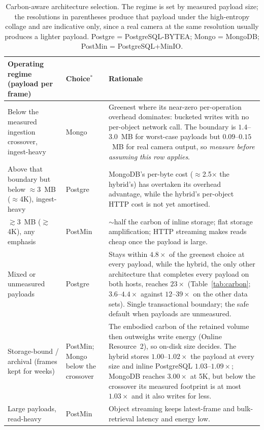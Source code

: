 \documentclass[pdflatex,sn-basic]{sn-jnl}%
\begin{document}
\begin{table}[htbp]
\caption{Carbon-aware architecture selection. The regime is set by measured payload size; the resolutions in parentheses produce that payload under the high-entropy collage and are indicative only, since a real camera at the same resolution usually produces a lighter payload. Postgre = PostgreSQL-BYTEA; Mongo = MongoDB; PostMin = PostgreSQL+MinIO.}\label{tab:decision}
\footnotesize
\begin{tabular}{@{}p{}p{}p{}@{}}
\toprule
Operating regime (payload per frame) & Choice$^{\ast}$ & Rationale \\
\midrule
Below the measured ingestion crossover, ingest-heavy & Mongo & Greenest where its near-zero per-operation overhead dominates: bucketed writes with no per-object network call. The boundary is $1.4$--$3.0$~MB for worst-case payloads but $0.09$--$0.15$~MB for real camera output, so \emph{measure before assuming this row applies}. \\
Above that boundary but below $\approx$3~MB ($\approx$4K), ingest-heavy & Postgre & MongoDB's per-byte cost ($\approx$2.5$\times$ the hybrid's) has overtaken its overhead advantage, while the hybrid's per-object HTTP cost is not yet amortised. \\
$\gtrsim$3~MB ($\gtrsim$4K), any emphasis & PostMin & $\sim$half the carbon of inline storage; flat storage amplification; HTTP streaming makes reads cheap once the payload is large. \\
Mixed or unmeasured payloads & Postgre & Stays within $4.8\times$ of the greenest choice at every payload, while the hybrid, the only other architecture that completes every payload on both hosts, reaches $23\times$ (Table~\ref{tab:carbon}; $3.6$--$4.4\times$ against $12$--$39\times$ on the other data sets). Single transactional boundary; the safe default when payloads are unmeasured. \\
Storage-bound / archival (frames kept for weeks) & PostMin; Mongo below the crossover & The embodied carbon of the retained volume then outweighs write energy (Online Resource~2), so on-disk size decides. The hybrid stores $1.00$--$1.02\times$ the payload at every size and inline PostgreSQL $1.03$--$1.09\times$; MongoDB reaches $3.00\times$ at 5K, but below the crossover its measured footprint is at most $1.03\times$ and it also writes for less. \\
Large payloads, read-heavy & PostMin & Object streaming keeps latest-frame and bulk-retrieval latency and energy low. \\

\end{tabular}
\end{table}
\end{document}

